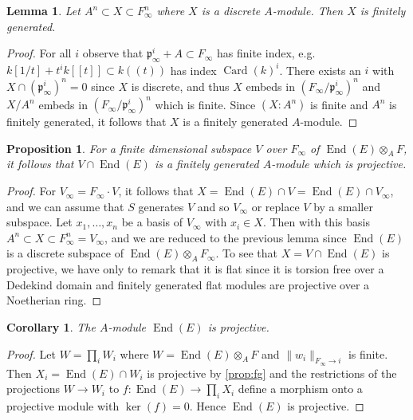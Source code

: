 \documentclass[12pt,a4paper]{article}
\theoremstyle{plain}
\newtheorem{lemma}{Lemma}[section]
\newtheorem{proposition}{Proposition}[section]
\newtheorem{corollary}{Corollary}[section]
\theoremstyle{definition}
\theoremstyle{remark}
\DeclareMathOperator{\End}{End}
\DeclareMathOperator{\Card}{Card}
\newcommand{\fp}{\mathfrak{p}}
\providecommand{\End}{\operatorname{End}}
\providecommand{\fp}{\mathfrak{p}}
\begin{document}
\begin{lemma}
\label{lem:fg}
Let $A^n \subset X \subset F_\infty^n$ where $X$ is a discrete $A$-module. Then $X$ is finitely generated.
\end{lemma}

\begin{proof}
For all $i$ observe that $\fp_\infty^i + A \subset F_\infty$ has finite index, e.g. $k[1/t] + t^i k[[t]] \subset k((t))$ has index $\Card(k)^i$. There exists an $i$ with $X \cap (\fp_\infty^i)^n = 0$ since $X$ is discrete, and thus $X$ embeds in $(F_\infty/\fp_\infty^i)^n$ and $X/A^n$ embeds in $(F_\infty/\fp_\infty^i)^n$ which is finite. Since $(X : A^n)$ is finite and $A^n$ is finitely generated, it follows that $X$ is a finitely generated $A$-module.
\end{proof}

\begin{proposition}
\label{prop:fg}
For a finite dimensional subspace $V$ over $F_\infty$ of $\End(E) \otimes_A F$, it follows that $V \cap \End(E)$ is a finitely generated $A$-module which is projective.
\end{proposition}

\begin{proof}
For $V_\infty = F_\infty \cdot V$, it follows that $X = \End(E) \cap V = \End(E) \cap V_\infty$, and we can assume that $S$ generates $V$ and so $V_\infty$ or replace $V$ by a smaller subspace. Let $x_1, \ldots, x_n$ be a basis of $V_\infty$ with $x_i \in X$. Then with this basis $A^n \subset X \subset F_\infty^n = V_\infty$, and we are reduced to the previous lemma since $\End(E)$ is a discrete subspace of $\End(E) \otimes_A F_\infty$. To see that $X = V \cap \End(E)$ is projective, we have only to remark that it is flat since it is torsion free over a Dedekind domain and finitely generated flat modules are projective over a Noetherian ring.
\end{proof}

\begin{corollary}
\label{cor:projective}
The $A$-module $\End(E)$ is projective.
\end{corollary}

\begin{proof}
Let $W = \prod_i W_i$ where $W = \End(E) \otimes_A F$ and $\|w_i\|_{F_\infty \to i}$ is finite. Then $X_i = \End(E) \cap W_i$ is projective by \eqref{prop:fg} and the restrictions of the projections $W \to W_i$ to $f: \End(E) \to \prod_i X_i$ define a morphism onto a projective module with $\ker(f) = 0$. Hence $\End(E)$ is projective.
\end{proof}
\end{document}
